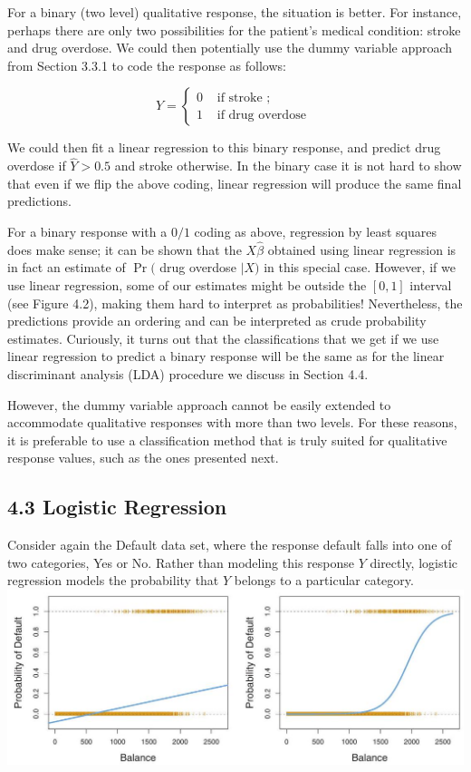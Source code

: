 \documentclass[10pt]{article}
\begin{document}
For a binary (two level) qualitative response, the situation is better. For instance, perhaps there are only two possibilities for the patient's medical condition: stroke and drug overdose. We could then potentially use the dummy variable approach from Section 3.3.1 to code the response as follows:

$$
Y= \begin{cases}0 & \text { if stroke } ; \\ 1 & \text { if drug overdose }\end{cases}
$$

We could then fit a linear regression to this binary response, and predict drug overdose if $\hat{Y}>0.5$ and stroke otherwise. In the binary case it is not hard to show that even if we flip the above coding, linear regression will produce the same final predictions.

For a binary response with a $0 / 1$ coding as above, regression by least squares does make sense; it can be shown that the $X \hat{\beta}$ obtained using linear regression is in fact an estimate of $\operatorname{Pr}($ drug overdose $\mid X)$ in this special case. However, if we use linear regression, some of our estimates might be outside the $[0,1]$ interval (see Figure 4.2), making them hard to interpret as probabilities! Nevertheless, the predictions provide an ordering and can be interpreted as crude probability estimates. Curiously, it turns out that the classifications that we get if we use linear regression to predict a binary response will be the same as for the linear discriminant analysis (LDA) procedure we discuss in Section 4.4.

However, the dummy variable approach cannot be easily extended to accommodate qualitative responses with more than two levels. For these reasons, it is preferable to use a classification method that is truly suited for qualitative response values, such as the ones presented next.

\subsection*{4.3 Logistic Regression}
Consider again the Default data set, where the response default falls into one of two categories, Yes or No. Rather than modeling this response $Y$ directly, logistic regression models the probability that $Y$ belongs to a particular category.\\
\includegraphics[max width=\textwidth, center]{2025_05_05_efe77898333945044de4g-146}
\end{document}
